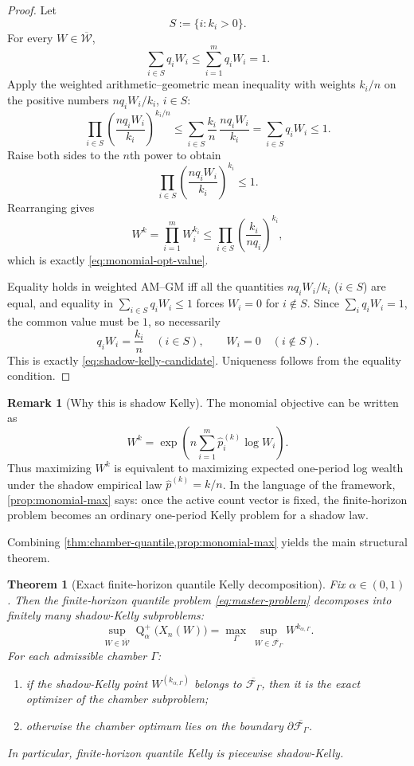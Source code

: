 \documentclass[11pt]{article}
\newtheorem{theorem}{Theorem}[section]
\theoremstyle{definition}
\newtheorem{remark}[remark]{Remark}
\newcommand{\1}{\mathbf{1}}
\newcommand{\Quant}{\operatorname{Q}}
\begin{document}
\begin{proof}
Let
\[
S:=\{i: k_i>0\}.
\]
For every $W\in\overline{\mathcal W}$,
\[
\sum_{i\in S} q_iW_i \le \sum_{i=1}^m q_iW_i=1.
\]
Apply the weighted arithmetic--geometric mean inequality with weights $k_i/n$ on the positive numbers $nq_iW_i/k_i$, $i\in S$:
\[
\prod_{i\in S}\left(\frac{nq_iW_i}{k_i}\right)^{k_i/n}
\le
\sum_{i\in S}\frac{k_i}{n}\,\frac{nq_iW_i}{k_i}
=
\sum_{i\in S} q_iW_i
\le 1.
\]
Raise both sides to the $n$th power to obtain
\[
\prod_{i\in S}\left(\frac{nq_iW_i}{k_i}\right)^{k_i}\le 1.
\]
Rearranging gives
\[
W^k=\prod_{i=1}^m W_i^{k_i}
\le
\prod_{i\in S}\left(\frac{k_i}{nq_i}\right)^{k_i},
\]
which is exactly \eqref{eq:monomial-opt-value}.

Equality holds in weighted AM--GM iff all the quantities $nq_iW_i/k_i$ ($i\in S$) are equal, and equality in $\sum_{i\in S}q_iW_i\le 1$ forces $W_i=0$ for $i\notin S$. Since $\sum_i q_iW_i=1$, the common value must be $1$, so necessarily
\[
q_iW_i=\frac{k_i}{n}\quad (i\in S),
\qquad
W_i=0\quad (i\notin S).
\]
This is exactly \eqref{eq:shadow-kelly-candidate}. Uniqueness follows from the equality condition.
\end{proof}

\begin{remark}[Why this is shadow Kelly]
The monomial objective can be written as
\[
W^k=\exp\!\left( n\sum_{i=1}^m \widehat p^{(k)}_i \log W_i\right).
\]
Thus maximizing $W^k$ is equivalent to maximizing expected one-period log wealth under the shadow empirical law $\widehat p^{(k)}=k/n$. In the language of the framework, \cref{prop:monomial-max} says: once the active count vector is fixed, the finite-horizon problem becomes an ordinary one-period Kelly problem for a shadow law.
\end{remark}

Combining \cref{thm:chamber-quantile,prop:monomial-max} yields the main structural theorem.

\begin{theorem}[Exact finite-horizon quantile Kelly decomposition]\label{thm:main-structural}
Fix $\alpha\in(0,1)$. Then the finite-horizon quantile problem \eqref{eq:master-problem} decomposes into finitely many shadow-Kelly subproblems:
\[
\sup_{W\in\overline{\mathcal W}} \Quant_\alpha^+\bigl(X_n(W)\bigr)
=
\max_{\Gamma}\ \sup_{W\in\overline{\mathcal F_\Gamma}} W^{k_{\alpha,\Gamma}}.
\]
For each admissible chamber $\Gamma$:
\begin{enumerate}[label=(\roman*), itemsep=3pt]
  \item if the shadow-Kelly point $W^{(k_{\alpha,\Gamma})}$ belongs to $\overline{\mathcal F_\Gamma}$, then it is the exact optimizer of the chamber subproblem;
  \item otherwise the chamber optimum lies on the boundary $\partial\overline{\mathcal F_\Gamma}$.
\end{enumerate}
In particular, finite-horizon quantile Kelly is \emph{piecewise shadow-Kelly}.
\end{theorem}
\end{document}
